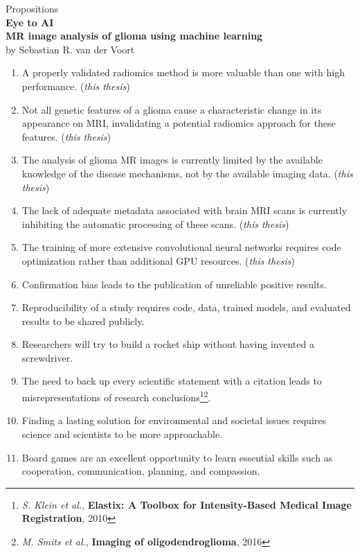 \documentclass{article}
\begin{document}
\thispagestyle{empty}
\begin{centering}
{\Large Propositions}\\
\vspace{2em}
\textbf{\LARGE Eye to AI}\\
\textbf{\LARGE MR image analysis of glioma using machine learning}\\
\vspace{2em}
{\large by Sebastian R. van der Voort}\\
\end{centering}
\vspace{5em}
\begin{enumerate}
    \item A properly validated radiomics method is more valuable than one with high performance. (\textit{this thesis})
    \item Not all genetic features of a glioma cause a characteristic change in its appearance on MRI, invalidating a potential radiomics approach for these features. (\textit{this thesis})
    \item The analysis of glioma MR images is currently limited by the available knowledge of the disease mechanisms, not by the available imaging data. (\textit{this thesis})
    \item The lack of adequate metadata associated with brain MRI scans is currently inhibiting the automatic processing of these scans. (\textit{this thesis})
    \item The training of more extensive convolutional neural networks requires code optimization rather than additional GPU resources. (\textit{this thesis})
    \item Confirmation bias leads to the publication of unreliable positive results.
    \item Reproducibility of a study requires code, data, trained models, and evaluated results to be shared publicly.
    \item Researchers will try to build a rocket ship without having invented a screwdriver.
    \item The need to back up every scientific statement with a citation leads to misrepresentations of research conclusions\footnote{\textit{S. Klein et al.}, \textbf{Elastix: A Toolbox for Intensity-Based Medical Image Registration}, 2010}\footnote{\textit{M. Smits et al.}, \textbf{Imaging of oligodendroglioma}, 2016}.
    \item Finding a lasting solution for environmental and societal issues requires science and scientists to be more approachable.
    \item Board games are an excellent opportunity to learn essential skills such as cooperation, communication, planning, and compassion.
\end{enumerate}
\end{document}
